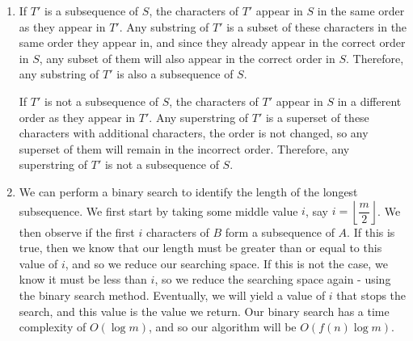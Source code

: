 \documentclass{article}
\begin{document}
\begin{solution}
\begin{enumerate}[label = (\alph*)]
    \item If $T'$ is a subsequence of $S$, the characters of $T'$ appear in $S$ in the same order as they appear in $T'$. Any substring of $T'$ is a subset of these characters in the same order they appear in, and since they already appear in the correct order in $S$, any subset of them will also appear in the correct order in $S$. Therefore, any substring of $T'$ is also a subsequence of $S$.

If $T'$ is not a subsequence of $S$, the characters of $T'$ appear in $S$ in a different order as they appear in $T'$. Any superstring of $T'$ is a superset of these characters with additional characters, the order is not changed, so any superset of them will remain in the incorrect order. Therefore, any superstring of $T'$ is not a subsequence of $S$.

    \item We can perform a binary search to identify the length of the longest subsequence. We first start by taking some middle value $i$, say $i = \left \lfloor \dfrac{m}{2} \right \rfloor$. We then observe if the first $i$ characters of $B$ form a subsequence of $A$. If this is true, then we know that our length must be greater than or equal to this value of $i$, and so we reduce our searching space. If this is not the case, we know it must be less than $i$, so we reduce the searching space again - using the binary search method. Eventually, we will yield a value of $i$ that stops the search, and this value is the value we return. Our binary search has a time complexity of $O(\log m)$, and so our algorithm will be $O\left( f(n) \log m \right).$
\end{enumerate}
\end{solution}
\end{document}
